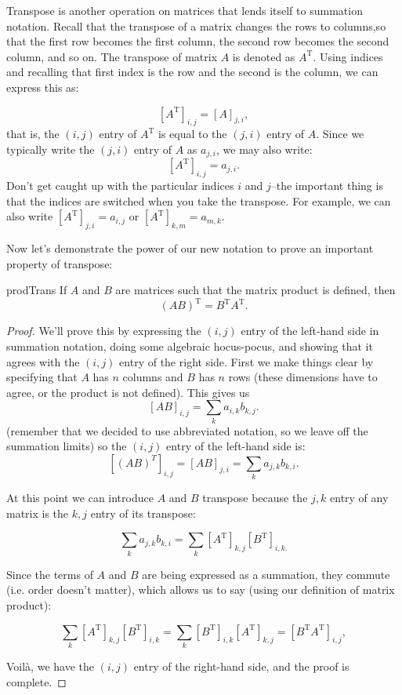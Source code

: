 Transpose is another operation on matrices that lends itself to summation notation.  Recall that the transpose of a matrix changes the rows to columns,so that the first row becomes the first column, the second row becomes the second column, and so on.  The transpose of matrix $A$ is denoted as $A^{\text{T}}$. Using indices and recalling that first index is the row and the second is the column, we can express this as:

\[ \left[ {A}^{\text{T}} \right]_{i,j} = \left[ A \right]_{j,i}, \]
that is, the $(i,j)$ entry of $A^{\text{T}}$ is equal to the $(j,i)$ entry of $A$.  Since we typically write the $(j,i)$ entry of $A$ as $a_{j,i}$, we may also write:
\[ \left[ {A}^{\text{T}} \right]_{i,j} = a_{j,i}. \]
Don't get caught up with the particular indices $i$ and $j$--the important thing is that the indices are switched when you take the transpose.  For example, we can also write $\left[ {A}^{\text{T}} \right]_{j,i} = a_{i,j}$ or 
$\left[ {A}^{\text{T}} \right]_{k,m} = a_{m,k}$.

Now let's demonstrate the power of our new notation to prove an important property of transpose:

\begin{prop}{prodTrans}
If $A$ and $B$ are matrices such that the matrix product is defined, then 
\[ \left( {A}{B} \right)^{\text{T}} = {B}^{\text{T}} {A}^{\text{T}}. \]
\end{prop}


\begin{proof}
We'll prove this by expressing the $(i,j)$ entry of the left-hand side in summation notation,  doing some algebraic hocus-pocus, and showing that it agrees with the $(i,j)$ entry of the right side.  First we make things clear by specifying that ${A}$ has $n$ columns and $B$ has $n$ rows (these dimensions have to agree, or the product is not defined). This gives us
\[ \left[ AB \right]_{i,j}= \sum_{k} a_{i,k} b_{k,j}. \]
(remember that we decided to use abbreviated notation, so we leave off the summation limits) so the $(i,j)$ entry of the left-hand side is:
 \[ \left[ (AB)^T \right]_{i,j} = \left[ AB \right]_{j,i} = \sum_{k} a_{j,k} b_{k,i}. \]

At this point we can introduce ${A}$ and ${B}$ transpose  because the $j,k$ entry of any matrix is the $k,j$ entry of its transpose:

\[  \sum_{k} a_{j,k} b_{k,i} =  \sum_{k} \left[A^{\text{T}}\right]_{k,j} \left[B^{\text{T}}\right]_{i,k.} \]

Since the terms of ${A}$ and ${B}$ are being expressed as a summation, they commute (i.e. order doesn't matter), which allows us to say (using our definition of matrix product):

\[ \sum_{k} \left[A^{\text{T}}\right]_{k,j} \left[B^{\text{T}}\right]_{i,k} = \sum_{k} \left[B^{\text{T}}\right]_{i,k}\left[A^{\text{T}}\right]_{k,j} = \left[ {B}^{\text{T}}{A}^{\text{T}} \right]_{i,j}, \]

Voil\`{a}, we have the $(i,j)$ entry of the right-hand side, and the proof is complete.
\end{proof}


